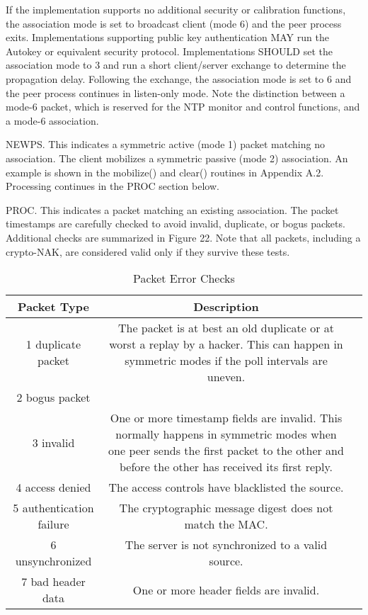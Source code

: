 If the implementation supports no additional security or calibration
functions, the association mode is set to broadcast client (mode 6)
and the peer process exits. Implementations supporting public key
authentication MAY run the Autokey or equivalent security protocol.
Implementations SHOULD set the association mode to 3 and run a short
client/server exchange to determine the propagation delay. Following
the exchange, the association mode is set to 6 and the peer process
continues in listen-only mode. Note the distinction between a mode-6
packet, which is reserved for the NTP monitor and control functions,
and a mode-6 association.

NEWPS. This indicates a symmetric active (mode 1) packet matching no
association. The client mobilizes a symmetric passive (mode 2)
association. An example is shown in the mobilize() and clear()
routines in Appendix A.2. Processing continues in the PROC section
below.

PROC. This indicates a packet matching an existing association. The
packet timestamps are carefully checked to avoid invalid, duplicate,
or bogus packets. Additional checks are summarized in Figure 22.
Note that all packets, including a crypto-NAK, are considered valid
only if they survive these tests.

\begin{table}[htb]
\center
\begin{tabular}{c | c | c}
Packet Type & Description \\
\hline
\hline
1 duplicate packet & The packet is at best an old duplicate or at worst a replay by a hacker. This can happen in symmetric modes if the poll intervals are uneven. \\
2 bogus packet & \\
3 invalid & One or more timestamp fields are invalid. This normally happens in symmetric modes when one peer sends the first packet to the other and before the other has received its first reply. \\
4 access denied & The access controls have blacklisted the source. \\
5 authentication failure & The cryptographic message digest does not match the MAC. \\
6 unsynchronized & The server is not synchronized to a valid source. \\
7 bad header data & One or more header fields are invalid. \\
\hline
\end{tabular}
\label{packet_error_checks}
\caption{Packet Error Checks}
\end{table}

